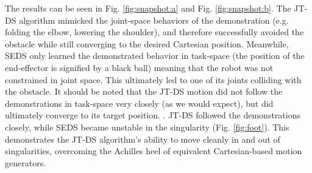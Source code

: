 \documentclass[letterpaper, 10 pt, conference,fleqn]{ieeeconf}
\begin{document}
The results can be seen in Fig. \ref{fig:snapshot:a} and Fig. \ref{fig:snapshot:b}. The JT-DS algorithm mimicked the joint-space behaviors of the demonstration (e.g. folding the elbow, lowering the shoulder), and therefore successfully avoided the obstacle while still converging to the desired Cartesian position. Meanwhile, SEDS only learned the demonstrated behavior in task-space (the position of the end-effector is signified by a black ball) meaning that the robot was not constrained in joint space. This ultimately led to one of its joints colliding with the obstacle. It should be noted that the JT-DS motion did not follow the demonstrations in task-space very closely (as we would expect), but did ultimately converge to its target position.
. JT-DS followed the demonstrations closely, while SEDS became unstable in the singularity (Fig. \ref{fig:foot}). This demonstrates the JT-DS algorithm's ability to move cleanly in and out of singularities, overcoming the Achilles heel of equivalent Cartesian-based motion generators.

\end{document}
